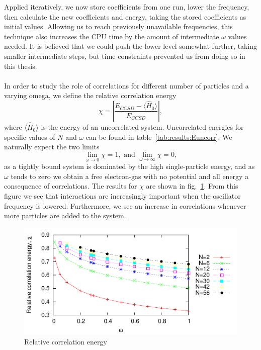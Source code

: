 Applied iteratively, we now store coefficients from one run, lower the frequency, then calculate the new coefficients and energy, taking the stored coefficients as initial values.
Allowing us to reach previously unavailable frequencies, this technique also increases the CPU time by the amount of intermediate $\omega$ values needed.
It is believed that we could push the lower level somewhat further, taking smaller intermediate steps, but time constraints prevented us from doing so in this thesis.


\paragraph{}
In order to study the role of correlations for different number of particles and a varying omega, we define the relative correlation energy
\begin{equation}
\label{eq:results:relCorr}
\chi = \left|  \frac{E_{CCSD} - \langle \hat{H}_0 \rangle}{E_{CCSD}}  \right| ,
\end{equation}
where $\langle \hat{H}_0 \rangle $ is the energy of an uncorrelated system. 
Uncorrelated energies for specific values of $N$ and $\omega$ can be found in table~\ref{tab:results:Euncorr}.
We naturally expect the two limits
\begin{equation}
\lim_{\omega \rightarrow 0} \chi = 1,
\textrm{ and }
\lim_{\omega \rightarrow \infty} \chi = 0,
\end{equation}
as a tightly bound system is dominated by the high single-particle energy, and as $\omega$ tends to zero we obtain a free electron-gas with no potential and all energy a consequence of correlations.
The results for $\chi$ are shown in fig.~\ref{fig:results:relCorr}.
From this figure we see that interactions are increasingly important when the oscillator frequency is lowered.
Furthermore, we see an increase in correlations whenever more particles are added to the system.
\begin{figure}
\begin{center}
\includegraphics[scale=1.4]{../10-results/figs/loweringOmega/correlationAllZoom.pdf}
\caption{Relative correlation energy}
\label{fig:results:relCorr}
\end{center}
\end{figure}


